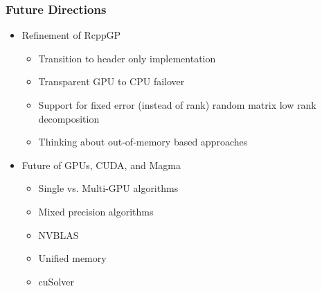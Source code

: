 \documentclass[t]{beamer}\usepackage[]{graphicx}\usepackage[]{color}
\begin{document}
\begin{frame}
\frametitle{Future Directions}

\begin{itemize}

\item Refinement of RcppGP

\vspace{1mm}
\begin{itemize}
  \vspace{1mm} \item Transition to header only implementation
  \vspace{1mm} \item Transparent GPU to CPU failover
  \vspace{1mm} \item Support for fixed error (instead of rank) random matrix low rank decomposition
  \vspace{1mm} \item Thinking about out-of-memory based approaches
\end{itemize}

\vspace{1mm}

\item Future of GPUs, CUDA, and Magma

\vspace{1mm}

\begin{itemize}
  \vspace{1mm} \item Single vs. Multi-GPU algorithms
  \vspace{1mm} \item Mixed precision algorithms
  \vspace{1mm} \item NVBLAS
  \vspace{1mm} \item Unified memory
  \vspace{1mm} \item cuSolver
\end{itemize}

\end{itemize}

\end{frame}


\end{document}
